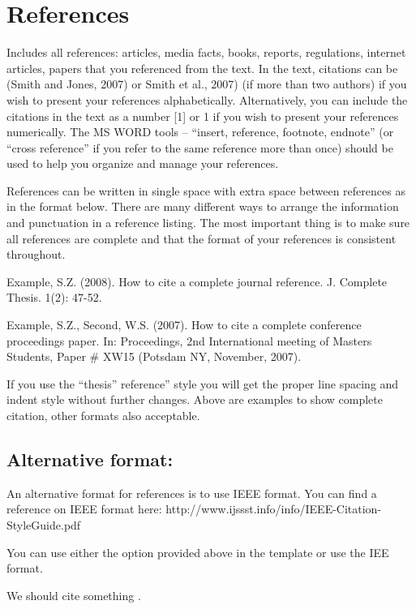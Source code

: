 \section*{References} \label{sectionReferences}

Includes all references: articles, media facts, books, reports, regulations, internet articles, papers that you referenced from the text.  In the text, citations can be (Smith and Jones, 2007) or Smith et al., 2007) (if more than two authors) if you wish to present your references alphabetically.  Alternatively, you can include the citations in the text as a number [1] or 1 if you wish to present your references numerically.  The MS WORD tools – “insert, reference, footnote, endnote” (or “cross reference” if you refer to the same reference more than once) should be used to help you organize and manage your references.

References can be written in single space with extra space between references as in the format below.  There are many different ways to arrange the information and punctuation in a reference listing.  The most important thing is to make sure all references are complete and that the format of your references is consistent throughout. 

Example, S.Z. (2008). How to cite a complete journal reference. J. Complete Thesis. 1(2): 47-52.

Example, S.Z., Second, W.S. (2007). How to cite a complete conference proceedings paper. In: Proceedings, 2nd International meeting of Masters Students, Paper \# XW15 (Potsdam NY, November, 2007).

If you use the “thesis” reference” style you will get the proper line spacing and indent style without further changes. Above are examples to show complete citation, other formats also acceptable.

\subsection*{Alternative format:}
An alternative format for references is to use IEEE format. You can find a reference on IEEE format here: http://www.ijssst.info/info/IEEE-Citation-StyleGuide.pdf

You can use either the option provided above in the template or use the IEE format. 

We should cite something \cite{omari:2018}.


\newpage


